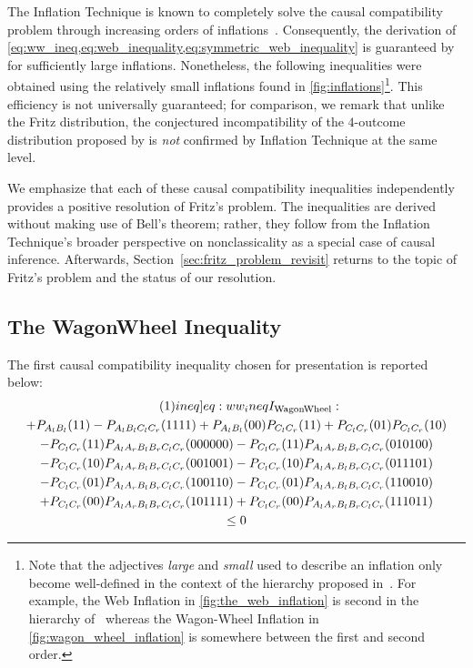 \documentclass[aps, 10pt, english, twoside, pra, nofootinbib, tightenlines, longbibliography, superscriptaddress]{revtex4-1}
\begin{document}
    The Inflation Technique is known to completely solve the causal compatibility problem through increasing orders of inflations~\cite{Navascues_2017}. Consequently, the derivation of \cref{eq:ww_ineq,eq:web_inequality,eq:symmetric_web_inequality} is guaranteed by~\cite{Navascues_2017} for sufficiently large inflations. Nonetheless, the following inequalities were obtained using the relatively small inflations found in \cref{fig:inflations}\footnote{Note that the adjectives \textit{large} and \textit{small} used to describe an inflation only become well-defined in the context of the hierarchy proposed in~\cite{Navascues_2017}. For example, the Web Inflation in \cref{fig:the_web_inflation} is second in the hierarchy of~\cite{Navascues_2017} whereas the Wagon-Wheel Inflation in \cref{fig:wagon_wheel_inflation} is somewhere between the first and second order.}. This efficiency is not universally guaranteed; for comparison, we remark that unlike the Fritz distribution, the conjectured incompatibility of the $4$-outcome distribution proposed by \cite{Gisin_2017} is \textit{not} confirmed by Inflation Technique at the same level.

    We emphasize that each of these causal compatibility inequalities independently provides a positive resolution of Fritz's problem. The inequalities are derived without making use of Bell's theorem; rather, they follow from the Inflation Technique's broader perspective on nonclassicality as a special case of causal inference. Afterwards, Section~\ref{sec:fritz_problem_revisit} returns to the topic of Fritz's problem and the status of our resolution.

    \subsection{The WagonWheel Inequality}
    The first causal compatibility inequality chosen for presentation is reported below:
    \begin{equation*}
    \begin{gathered}
        \eq\label[ineq]{eq:ww_ineq}
        I\tsb{WagonWheel} : \\
        +P_{A_{l}B_{l}}(11) -P_{A_{l}B_{l}C_{l}C_{r}}(1111) +P_{A_{l}B_{l}}(00) P_{C_{l}C_{r}}(11) +P_{C_{l}C_{r}}(01) P_{C_{l}C_{r}}(10) \\
        -P_{C_{l}C_{r}}(11) P_{A_{l}A_{r}B_{l}B_{r}C_{l}C_{r}}(000000) -P_{C_{l}C_{r}}(11) P_{A_{l}A_{r}B_{l}B_{r}C_{l}C_{r}}(010100) \\
        -P_{C_{l}C_{r}}(10) P_{A_{l}A_{r}B_{l}B_{r}C_{l}C_{r}}(001001) -P_{C_{l}C_{r}}(10) P_{A_{l}A_{r}B_{l}B_{r}C_{l}C_{r}}(011101) \\
        -P_{C_{l}C_{r}}(01) P_{A_{l}A_{r}B_{l}B_{r}C_{l}C_{r}}(100110) -P_{C_{l}C_{r}}(01) P_{A_{l}A_{r}B_{l}B_{r}C_{l}C_{r}}(110010) \\
        +P_{C_{l}C_{r}}(00) P_{A_{l}A_{r}B_{l}B_{r}C_{l}C_{r}}(101111) +P_{C_{l}C_{r}}(00) P_{A_{l}A_{r}B_{l}B_{r}C_{l}C_{r}}(111011) \\
        \leq 0
    \end{gathered}
    \end{equation*}
\end{document}
